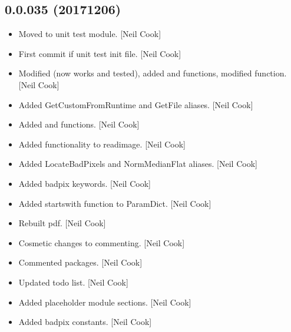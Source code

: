 \documentclass[a4paper,10pt,english]{report}
\begin{document}
\subsection{0.0.035 (2017\sphinxhyphen{}12\sphinxhyphen{}06)}
\label{\detokenize{misc/changelog:id535}}\begin{itemize}
\item {} 
Moved  to unit test module. {[}Neil Cook{]}

\item {} 
First commit if unit test init file. {[}Neil Cook{]}

\item {} 
Modified  (now works and tested), added
 and  functions, modified
 function. {[}Neil Cook{]}

\item {} 
Added GetCustomFromRuntime and GetFile aliases. {[}Neil Cook{]}

\item {} 
Added  and  functions. {[}Neil
Cook{]}

\item {} 
Added functionality to readimage. {[}Neil Cook{]}

\item {} 
Added LocateBadPixels and NormMedianFlat aliases. {[}Neil Cook{]}

\item {} 
Added badpix keywords. {[}Neil Cook{]}

\item {} 
Added startswith function to ParamDict. {[}Neil Cook{]}

\item {} 
Rebuilt pdf. {[}Neil Cook{]}

\item {} 
Cosmetic changes to commenting. {[}Neil Cook{]}

\item {} 
Commented packages. {[}Neil Cook{]}

\item {} 
Updated to\sphinxhyphen{}do list. {[}Neil Cook{]}

\item {} 
Added placeholder module sections. {[}Neil Cook{]}

\item {} 
Added badpix constants. {[}Neil Cook{]}


\end{itemize}
\end{document}

